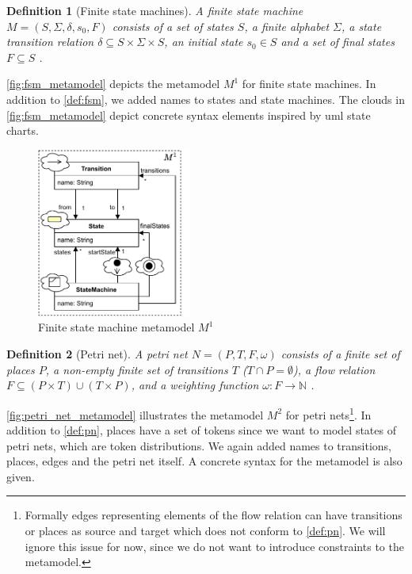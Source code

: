 \documentclass[conference]{IEEEtran}
\newtheorem{definition}{Definition}
\begin{document}
\begin{definition}[Finite state machines] \label{def:fsm}
    A finite state machine $M=(S, \Sigma, \delta, s_0, F)$ consists of a set of states $S$, a finite alphabet $\Sigma$, a state transition relation $\delta \subseteq S \times \Sigma \times S$, an initial state $s_0 \in S$ and a set of final states $F \subseteq S$ \cite{kunzeBehaviouralModelsModelling2016}. %
\end{definition}

\autoref{fig:fsm_metamodel} depicts the metamodel $M^1$ for finite state machines.
In addition to \autoref{def:fsm}, we added names to states and state machines.
The clouds in \autoref{fig:fsm_metamodel} depict concrete syntax elements inspired by \gls{uml} state charts.

\begin{figure}[h]
    \centering
    \includegraphics[width=2in]{state_machine_metamodel}
    \caption{Finite state machine metamodel $M^1$}
    \label{fig:fsm_metamodel}
\end{figure}

\begin{definition}[Petri net] \label{def:pn}
    A petri net $N=(P,T,F, \omega)$ consists of a finite set of places $P$, a non-empty finite set of transitions $T$ ($T \cap P = \emptyset $), a flow relation $F \subseteq (P \times T) \cup (T \times P)$, and a weighting function $\omega: F \to \mathbb{N}$ \cite{kunzeBehaviouralModelsModelling2016}. %
\end{definition}

\autoref{fig:petri_net_metamodel} illustrates the metamodel $M^2$ for petri nets\footnote{Formally edges representing elements of the flow relation can have transitions or places as source and target which does not conform to \autoref{def:pn}.
We will ignore this issue for now, since we do not want to introduce constraints to the metamodel.}.
In addition to \autoref{def:pn}, places have a set of tokens since we want to model states of petri nets, which are token distributions.
We again added names to transitions, places, edges and the petri net itself.
A concrete syntax for the metamodel is also given.
\end{document}
